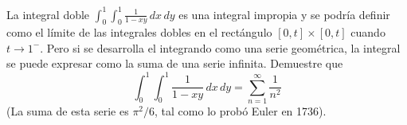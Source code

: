 \item La integral doble $\int_0^1 \int_0^1 \frac{1}{1 - xy} \, dx \, dy$ es una integral impropia y se podría definir como el límite de las integrales dobles en el rectángulo $[0, t] \times [0, t]$ cuando $t \to 1^-$. Pero si se desarrolla el integrando como una serie geométrica, la integral se puede expresar como la suma de una serie infinita. Demuestre que
    \[ \int_0^1 \int_0^1 \frac{1}{1 - xy} \, dx \, dy = \sum_{n=1}^\infty \frac{1}{n^2} \]
    (La suma de esta serie es $\pi^2/6$, tal como lo probó Euler en 1736).
